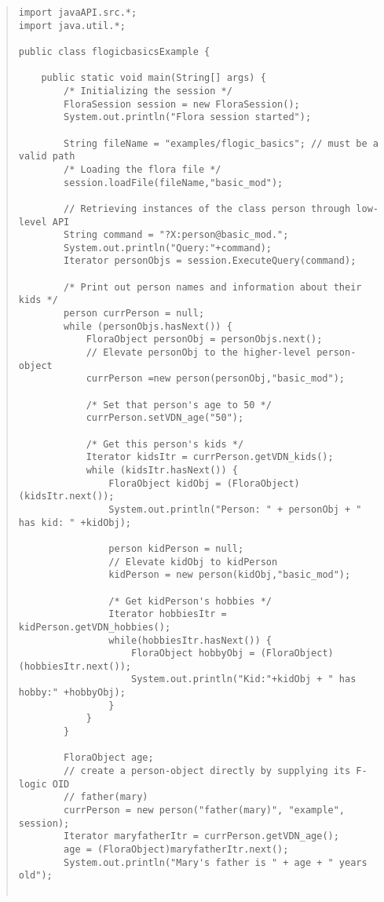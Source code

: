 \begin{quote}
\begin{verbatim}
import javaAPI.src.*;
import java.util.*;

public class flogicbasicsExample {

    public static void main(String[] args) {
        /* Initializing the session */
        FloraSession session = new FloraSession();
        System.out.println("Flora session started");

        String fileName = "examples/flogic_basics"; // must be a valid path
        /* Loading the flora file */
        session.loadFile(fileName,"basic_mod");

        // Retrieving instances of the class person through low-level API
        String command = "?X:person@basic_mod.";
        System.out.println("Query:"+command);
        Iterator personObjs = session.ExecuteQuery(command);

        /* Print out person names and information about their kids */
        person currPerson = null;
        while (personObjs.hasNext()) {
            FloraObject personObj = personObjs.next();
            // Elevate personObj to the higher-level person-object
            currPerson =new person(personObj,"basic_mod");

            /* Set that person's age to 50 */
            currPerson.setVDN_age("50");

            /* Get this person's kids */
            Iterator kidsItr = currPerson.getVDN_kids();
            while (kidsItr.hasNext()) {
                FloraObject kidObj = (FloraObject)(kidsItr.next());
                System.out.println("Person: " + personObj + " has kid: " +kidObj);

                person kidPerson = null;
                // Elevate kidObj to kidPerson
                kidPerson = new person(kidObj,"basic_mod");

                /* Get kidPerson's hobbies */
                Iterator hobbiesItr = kidPerson.getVDN_hobbies();
                while(hobbiesItr.hasNext()) {
                    FloraObject hobbyObj = (FloraObject)(hobbiesItr.next());
                    System.out.println("Kid:"+kidObj + " has hobby:" +hobbyObj);
                }
            }
        }

        FloraObject age;
        // create a person-object directly by supplying its F-logic OID
        // father(mary)
        currPerson = new person("father(mary)", "example", session);
        Iterator maryfatherItr = currPerson.getVDN_age();
        age = (FloraObject)maryfatherItr.next();
        System.out.println("Mary's father is " + age + " years old");


\end{verbatim}
\end{quote}
